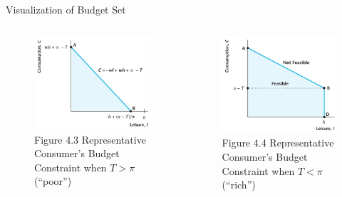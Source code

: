 \documentclass[11pt,aspectratio=169,usenames,dvipsnames]{beamer}
\begin{document}
\begin{frame}{Visualization of Budget Set}
\label{slide:Visualization_of_Budget_Set}
    \begin{columns}
        \begin{column}{0.5\textwidth}
            \begin{figure}
                \caption{Figure 4.3 Representative Consumer's Budget Constraint when $ T > \pi $ (``poor'')}
                \includegraphics[width=.9\textwidth]{./figures/Figure4_3.jpg}
            \end{figure}
        \end{column}
        \begin{column}{0.5\textwidth}
            \begin{figure}
                \caption{Figure 4.4 Representative Consumer's Budget Constraint when $ T < \pi $ (``rich'')}
                \includegraphics[width=.9\textwidth]{./figures/Figure4_4.jpg}
            \end{figure}
        \end{column}
    \end{columns}
\end{frame}
\end{document}
